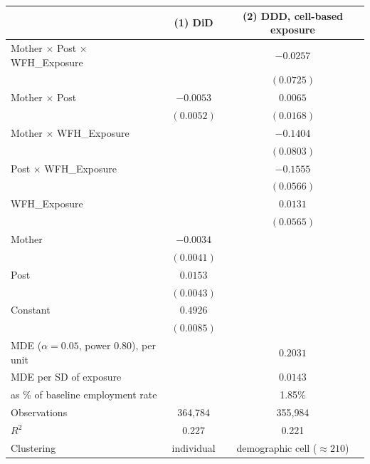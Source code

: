 \begin{tabular}{lcc}
\toprule
 & (1) DiD & (2) DDD, cell-based exposure \\
\midrule
Mother $\times$ Post $\times$ WFH\_Exposure &  & $-0.0257$ \\
 &  & $(0.0725)$ \\
Mother $\times$ Post & $-0.0053$ & $0.0065$ \\
 & $(0.0052)$ & $(0.0168)$ \\
Mother $\times$ WFH\_Exposure &  & $-0.1404$\sym{\cdot} \\
 &  & $(0.0803)$ \\
Post $\times$ WFH\_Exposure &  & $-0.1555$\sym{**} \\
 &  & $(0.0566)$ \\
WFH\_Exposure &  & $0.0131$ \\
 &  & $(0.0565)$ \\
Mother & $-0.0034$ &  \\
 & $(0.0041)$ &  \\
Post & $0.0153$\sym{***} &  \\
 & $(0.0043)$ &  \\
Constant & $0.4926$\sym{***} &  \\
 & $(0.0085)$ &  \\
\midrule
MDE ($\alpha=0.05$, power $0.80$), per unit &  & $0.2031$ \\
MDE per SD of exposure &  & $0.0143$ \\
\quad as \% of baseline employment rate &  & 1.85\% \\
\midrule
Observations & 364{,}784 & 355{,}984 \\
$R^2$ & 0.227 & 0.221 \\
Clustering & individual & demographic cell ($\approx 210$) \\
\bottomrule
\end{tabular}
